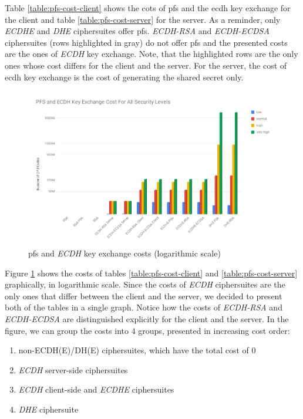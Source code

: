 \documentclass{llncs}
\begin{document}
Table \ref{table:pfs-cost-client} shows the cots of \gls{pfs} and the \gls{ecdh} key exchange for the client and table \ref{table:pfs-cost-server}
for the server. As a reminder, only \textit{ECDHE} and \textit{DHE} ciphersuites offer \gls{pfs}. \textit{ECDH-RSA} and \textit{ECDH-ECDSA}
ciphersuites (rows highlighted in gray) do not offer \gls{pfs} and the presented costs are the ones of \textit{ECDH} key exchange. Note, that the
highlighted rows are the only ones whose cost differs for
the client and the server. For the server, the cost of \gls{ecdh} key exchange is the cost of generating the shared secret only.

\begin{figure}
  \centering
  \includegraphics[width=1.0\textwidth]{img/pfs_cost_all_sls.png}
  \centering \caption{\label{fig:pfs-cost-all-sls} \gls{pfs} and \textit{ECDH} key exchange costs (logarithmic scale)}
\end{figure}

Figure \ref{fig:pfs-cost-all-sls} shows the costs of tables \ref{table:pfs-cost-client} and \ref{table:pfs-cost-server} graphically, in logarithmic scale.
 Since the costs
of \textit{ECDH} ciphersuites are the only ones that differ between the client and the server, we decided to present both of the tables in a
single graph. Notice how the costs of \textit{ECDH-RSA} and \textit{ECDH-ECDSA} are distinguished explicitly for the client and the server.
In the figure, we can group the costs into $4$ groups, presented in increasing cost order:

\begin{enumerate}
  \item non-ECDH(E)/DH(E) ciphersuites, which have the total cost of $0$
  \item \textit{ECDH} server-side ciphersuites
  \item \textit{ECDH} client-side and \textit{ECDHE} ciphersuites
  \item \textit{DHE} ciphersuite
\end{enumerate}
\end{document}
